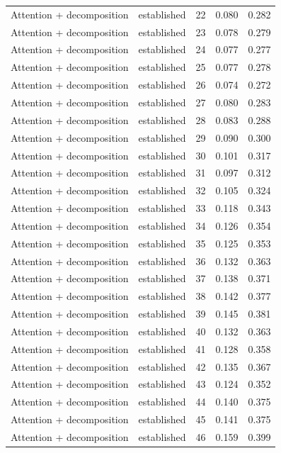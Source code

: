 \begin{tabular}{llrrr}
Attention + decomposition & established & 22 & 0.080 & 0.282 \\
Attention + decomposition & established & 23 & 0.078 & 0.279 \\
Attention + decomposition & established & 24 & 0.077 & 0.277 \\
Attention + decomposition & established & 25 & 0.077 & 0.278 \\
Attention + decomposition & established & 26 & 0.074 & 0.272 \\
Attention + decomposition & established & 27 & 0.080 & 0.283 \\
Attention + decomposition & established & 28 & 0.083 & 0.288 \\
Attention + decomposition & established & 29 & 0.090 & 0.300 \\
Attention + decomposition & established & 30 & 0.101 & 0.317 \\
Attention + decomposition & established & 31 & 0.097 & 0.312 \\
Attention + decomposition & established & 32 & 0.105 & 0.324 \\
Attention + decomposition & established & 33 & 0.118 & 0.343 \\
Attention + decomposition & established & 34 & 0.126 & 0.354 \\
Attention + decomposition & established & 35 & 0.125 & 0.353 \\
Attention + decomposition & established & 36 & 0.132 & 0.363 \\
Attention + decomposition & established & 37 & 0.138 & 0.371 \\
Attention + decomposition & established & 38 & 0.142 & 0.377 \\
Attention + decomposition & established & 39 & 0.145 & 0.381 \\
Attention + decomposition & established & 40 & 0.132 & 0.363 \\
Attention + decomposition & established & 41 & 0.128 & 0.358 \\
Attention + decomposition & established & 42 & 0.135 & 0.367 \\
Attention + decomposition & established & 43 & 0.124 & 0.352 \\
Attention + decomposition & established & 44 & 0.140 & 0.375 \\
Attention + decomposition & established & 45 & 0.141 & 0.375 \\
Attention + decomposition & established & 46 & 0.159 & 0.399 \\

\end{tabular}
